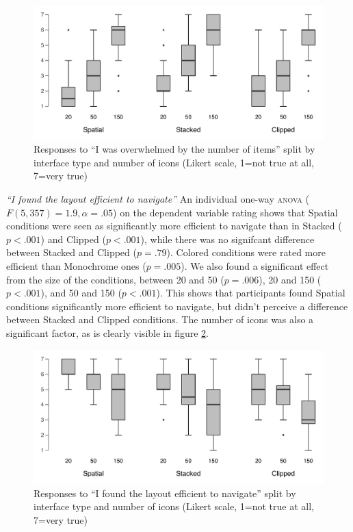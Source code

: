 \documentclass[nobib]{tufte-book} %
\begin{document}
\begin{figure}
\includegraphics{postcon-overwhelmed.pdf}
\caption{Responses to ``I was overwhelmed by the number of items'' split by interface type and number of icons (Likert scale, 1=not true at all, 7=very true)}
\label{fig:overwhelmed}
\end{figure}

\emph{``I found the layout efficient to navigate''}
An individual one-way \textsc{anova} ($F(5,357) = 1.9, \alpha = .05$) on the dependent variable rating shows that Spatial conditions were seen as significantly more efficient to navigate than in Stacked ($p < .001$) and Clipped ($p < .001$), while there was no signifcant difference between Stacked and Clipped ($p = .79$). Colored conditions were rated more efficient than Monochrome ones ($p = .005$). We also found a significant effect from the size of the conditions, between 20 and 50 ($p = .006$), 20 and 150 ($p < .001$), and 50 and 150 ($p < .001$). This shows that participants found Spatial conditions significantly more efficient to navigate, but didn't perceive a difference between Stacked and Clipped conditions. The number of icons was also a significant factor, as is clearly visible in figure \ref{fig:efficient}.

\begin{figure}
\includegraphics{postcon-efficient.pdf}
\caption{Responses to ``I found the layout efficient to navigate'' split by interface type and number of icons (Likert scale, 1=not true at all, 7=very true)}
\label{fig:efficient}
\end{figure}
\end{document}

